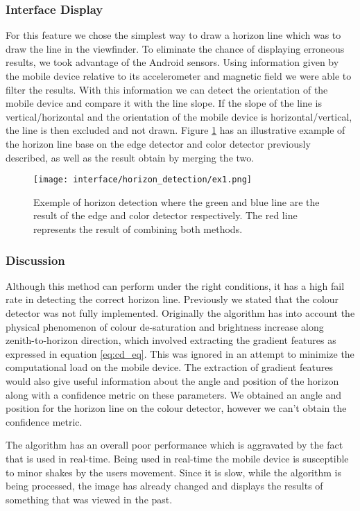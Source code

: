 \subsubsection{Interface Display}

For this feature we chose the simplest way to draw a horizon line which was to draw the line in the viewfinder. To eliminate the chance of displaying erroneous results, we took advantage of the Android sensors. Using information given by the mobile device relative to its accelerometer and magnetic field we were able to filter the results. With this information we can detect the orientation of the mobile device and compare it with the line slope. If the slope of the line is vertical/horizontal and the orientation of the mobile device is horizontal/vertical, the line is then excluded and not drawn. Figure \ref{fig:hori_ex} has an illustrative example of the horizon line base on the edge detector and color detector previously described, as well as the result obtain by merging the two.
\begin{figure}[htbp]
	\centering
    \texttt{[image: interface/horizon\_detection/ex1.png]}
    \caption{Exemple of horizon detection where the green and blue line are the result of the edge and color detector respectively. The red line represents the result of combining both methods.}
    \label{fig:hori_ex}
\end{figure}

\subsubsection{Discussion}

Although this method can perform under the right conditions, it has a high fail rate in detecting the correct horizon line. Previously we stated that the colour detector was not fully implemented. Originally the algorithm has into account the physical phenomenon of colour de-saturation and brightness increase along zenith-to-horizon direction, which involved extracting the gradient features as expressed in equation \ref{eq:cd_eq}. This was ignored in an attempt to minimize the computational load on the mobile device. 
The extraction of gradient features would also give useful information about the angle and position of the horizon along with a confidence metric on these parameters. We obtained an angle and position for the horizon line on the colour detector, however we can't obtain the confidence metric. 

The algorithm has an overall poor performance which is aggravated by the fact that is used in real-time. Being used in real-time the mobile device is susceptible to minor shakes by the users movement. Since it is slow, while the algorithm is being processed, the image has already changed and displays the results of something that was viewed in the past.

